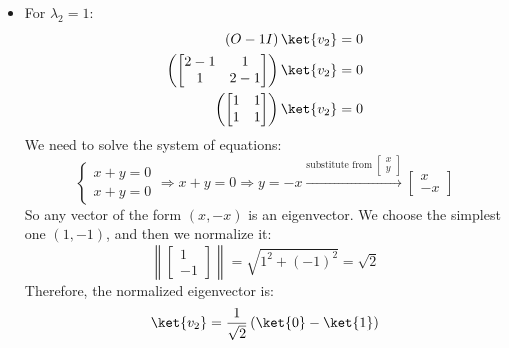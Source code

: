 \begin{itemize}
\begin{itemize}
        \item For $\lambda_2 = 1$:
        \begin{align*}
            \left(O - 1I\right)\ket{v_2} &= 0 \\
            \left(\begin{bmatrix}
                2 - 1 & 1 \\
                1 & 2 - 1
            \end{bmatrix}\right)\ket{v_2} &= 0 \\
            \left(\begin{bmatrix}
                1 & 1 \\
                1 & 1
            \end{bmatrix}\right)\ket{v_2} &= 0
        \end{align*}
        We need to solve the system of equations:
        \begin{equation*}
            \begin{cases}
                x + y = 0 \\
                x + y = 0
            \end{cases}
            \Rightarrow
            x + y = 0 \Rightarrow y = -x \xrightarrow{\text{substitute from }\begin{bmatrix}
                x \\ y
            \end{bmatrix}}
            \begin{bmatrix}
                x \\
                -x
            \end{bmatrix}
        \end{equation*}
        So any vector of the form $\left(x, -x\right)$ is an eigenvector. We choose the simplest one $\left(1, -1\right)$, and then we normalize it:
        \begin{equation*}
            \left\| \begin{bmatrix}
                1 \\
                -1
            \end{bmatrix} \right\| = \sqrt{1^2 + (-1)^2} = \sqrt{2}
        \end{equation*}
        Therefore, the normalized eigenvector is:
        \begin{equation*}
            \ket{v_2} = \frac{1}{\sqrt{2}}\left(\ket{0} - \ket{1}\right)
        \end{equation*}
    \end{itemize}
\end{itemize}
